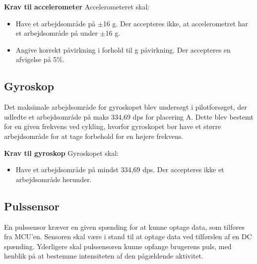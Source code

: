 \textbf{Krav til accelerometer} \newline 
Accelerometeret skal:
\begin{itemize}
\item Have et arbejdsområde på $\pm$16 g. Der accepteres ikke, at accelerometret har et arbejdsområde på under $\pm$16 g.
\item Angive korrekt påvirkning i forhold til g påvirkning. Der accepteres en afvigelse på 5\%.
\end{itemize}

\subsection{Gyroskop} \label{krav:gyro}
Det maksimale arbejdsområde for gyroskopet blev undersøgt i pilotforsøget, der udledte et arbejdsområde på maks 334,69 dps for placering A. Dette blev bestemt for en given frekvens ved cykling, hvorfor gyroskopet bør have et større arbejdsområde for at tage forbehold for en højere frekvens. %

\textbf{Krav til gyroskop} \newline
Gyroskopet skal:
\begin{itemize}
\item Have et arbejdsområde på mindst 334,69 dps. Der accepteres ikke et arbejdsområde herunder.
\end{itemize}

\subsection{Pulssensor} \label{puls_krav}
En pulssensor kræver en given spænding for at kunne optage data, som tilføres fra MCU'en. Sensoren skal være i stand til at optage data ved tilførslen af en DC spænding. %
Yderligere skal pulssensoren kunne opfange brugerens puls, med henblik på at bestemme intensiteten af den pågældende aktivitet.

